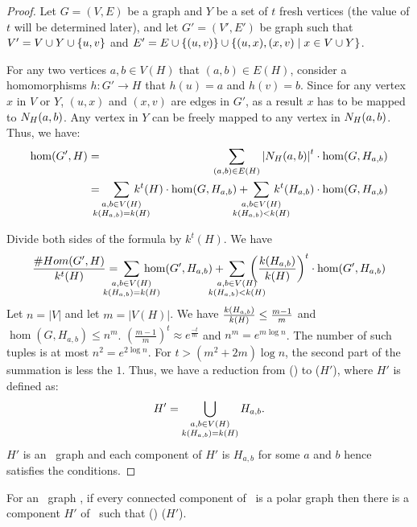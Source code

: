 \begin{proof}
Let \(G=(V,E)\) be a graph and \(Y\) be a set of \(t\) fresh vertices
(the value of \(t\) will be determined later), and let \(G'=(V',E')\) be
graph such that \(V'=V \cup Y \cup \{{u,v}\}\) and \(E'=E \cup \{{(u,v)}\} \cup
\{{(u,x),(x,v) \mid x\in V \cup Y}\}\)\@.

For any two vertices \(a,b \in V(H)\) that \((a,b)\in E(H)\), consider a homomorphisms
\(h: G'\to H\) that \(h(u)=a\) and \(h(v)=b\). Since for any vertex \(x\) in \(V\) or \(Y\),
\((u,x)\) and \((x,v)\) are edges in \(G'\), as a result \(x\) has to be mapped to \(N_{H}({a},{b})\)\@.
Any vertex in \(Y\) can be freely mapped to any vertex in \(N_{H}({a},{b})\)\@. Thus, we have:
\begin{eqnarray*}
\hom(G',H) &=&  
\sum_{(a,b)\in E(H)}\left|\NHab Hab\right|^ t \cdot
\hom(G,\Hab)\\
&=& 
\bigsum{\substack{a,b\in V(H) \\
\magf(H_{a,b})=\magf(H)}} 
\magf^t(H) \cdot \hom(G,H_{a,b})+
\bigsum{\substack{a,b\in V(H) \\ \magf(H_{a,b}) < \magf(H)}}k^t
(H_{a,b})\cdot \hom(G,H_{a,b})
\end{eqnarray*}

Divide both sides of the formula by \(k^t(H)\)\@. We have
\[\frac{\chom(G',H)}{\magf^t(H)} =  
\bigsum{\substack{a,b\in V(H) \\ \magf(H_{a,b})=\magf(H)}} 
\hom(G',H_{a,b}) + 
\bigsum{\substack{a,b\in V(H) \\ \magf(H_{a,b})<\magf(H)}}
\left(\frac{\magf(H_{a,b})}{\magf(H)} \right )^t
\cdot\hom(G',H_{a,b})
\]
Let \(n=|V|\) and let \(m=|V(H)|\). We have \(\frac{k(H_{a,b})}{k(H)} \le \frac{m-1}{m}\)
and \(\hom(G,H_{a,b}) \le n^m\). \((\frac{m-1}{m})^t \approx e^{\frac{-t}{m}}\)
and \(n^m = e^{m\log n}\)\@. The number of such tuples is at most \(n^2 = e^{2\log n}\).
For \(t > (m^2+2m) \log n\), the second part of the summation is less the \(1\).
Thus, we have a reduction from \chom(\mH) to \chom(\(H'\)), where \(H'\) is defined as:
\[H'=\bigcup_{\substack{a,b\in V(H) \\
k(H_{a,b})=k(H)}} H_{a,b}.\]
\(H'\) is an \RBA\ graph and each component of \(H'\) 
is \(H_{a,b}\) for some \(a\) and \(b\) hence satisfies the conditions.
\end{proof}

\begin{lemma} \label{lem:connected}
For an \RBA\ graph \mH, if every connected component of 
\mH\ is a polar graph then there is a component \(H'\) of \mH\ 
such that \chom(\mH) \mapge \chom(\(H'\)).
\end{lemma}

